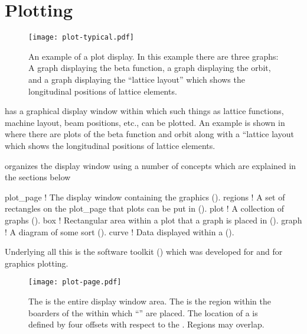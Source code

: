 \chapter{Plotting}
\label{c:plotting}

\begin{figure}[b]
  \centering
  \texttt{[image: plot-typical.pdf]}
  \caption[An example of a plot display.]
{An example of a plot display. In this example there are three graphs: A graph displaying the beta
function, a graph displaying the orbit, and a graph displaying the ``lattice layout'' which shows
the longitudinal positions of lattice elements.}
  \label{f:plot.typ}
\end{figure}

\tao has a graphical display window within which such things as lattice functions, machine layout,
beam positions, etc., can be plotted. An example is shown in  where there are plots
of the beta function and orbit along with a ``lattice layout which shows the longitudinal positions
of lattice elements. 

\tao organizes the display window using a number of concepts which are explained in the 
sections below
\begin{example}
  plot_page     ! The display window containing the graphics ().
  regions       ! A set of rectangles on the plot_page that plots can be put in ().
  plot          ! A collection of graphs ().
  box           ! Rectangular area within a plot that a graph is placed in ().
  graph         ! A diagram of some sort ().
  curve         ! Data displayed within a  ().
\end{example}

Underlying all this is the  software toolkit () which was developed
for \bmad and \tao for graphics plotting.


\begin{figure}[bt]
  \centering
  \texttt{[image: plot-page.pdf]}
  \caption[The plot window.]{The  is the entire display window area. The  
is the region within the boarders of the  within which ``'' are
placed. The location of a  is defined by four offsets with respect to the . Regions may overlap.}
  \label{f:plot.page}
\end{figure}

